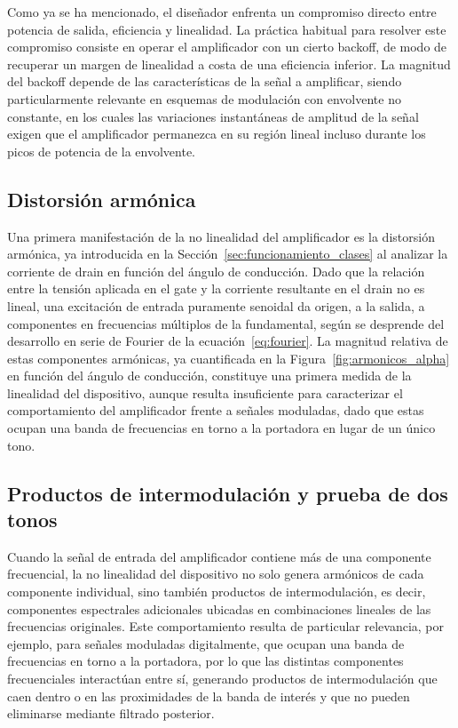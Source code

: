 Como ya se ha mencionado, el diseñador enfrenta un compromiso directo entre potencia de salida, eficiencia y linealidad. La práctica habitual para resolver este compromiso consiste en operar el amplificador con un cierto backoff, de modo de recuperar un margen de linealidad a costa de una eficiencia inferior. La magnitud del backoff depende de las características de la señal a amplificar, siendo particularmente relevante en esquemas de modulación con envolvente no constante, en los cuales las variaciones instantáneas de amplitud de la señal exigen que el amplificador permanezca en su región lineal incluso durante los picos de potencia de la envolvente.

\subsection{Distorsión armónica}
Una primera manifestación de la no linealidad del amplificador es la distorsión armónica, ya introducida en la Sección~\ref{sec:funcionamiento_clases} al analizar la corriente de drain en función del ángulo de conducción. Dado que la relación entre la tensión aplicada en el gate y la corriente resultante en el drain no es lineal, una excitación de entrada puramente senoidal da origen, a la salida, a componentes en frecuencias múltiplos de la fundamental, según se desprende del desarrollo en serie de Fourier de la ecuación~\eqref{eq:fourier}. La magnitud relativa de estas componentes armónicas, ya cuantificada en la Figura~\ref{fig:armonicos_alpha} en función del ángulo de conducción, constituye una primera medida de la linealidad del dispositivo, aunque resulta insuficiente para caracterizar el comportamiento del amplificador frente a señales moduladas, dado que estas ocupan una banda de frecuencias en torno a la portadora en lugar de un único tono.

\subsection{Productos de intermodulación y prueba de dos tonos} \label{sec:dos_tonos}
Cuando la señal de entrada del amplificador contiene más de una componente frecuencial, la no linealidad del dispositivo no solo genera armónicos de cada componente individual, sino también productos de intermodulación, es decir, componentes espectrales adicionales ubicadas en combinaciones lineales de las frecuencias originales. Este comportamiento resulta de particular relevancia, por ejemplo, para señales moduladas digitalmente, que ocupan una banda de frecuencias en torno a la portadora, por lo que las distintas componentes frecuenciales interactúan entre sí, generando productos de intermodulación que caen dentro o en las proximidades de la banda de interés y que no pueden eliminarse mediante filtrado posterior.

